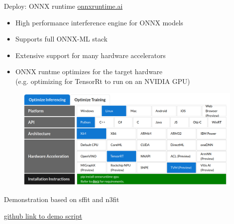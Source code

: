 \documentclass[aspectratio=169,9pt]{beamer}
\begin{document}
\begin{frame}[t]{Deploy: ONNX runtime}{\color{blue} \href{https://onnxruntime.ai/}{onnxruntime.ai}}
  \begin{itemize}
    \item High performance interference engine for ONNX models
    \item Supports full ONNX-ML stack
    \item Extensive support for many hardware accelerators
    \item ONNX runtme optimizes for the target hardware \\
          (e.g. optimizing for TensorRt to run on an NVIDIA GPU)
  \end{itemize}
  \begin{figure}
    \centering
    \includegraphics[width=.6\textwidth]{ONNX-runtime-get-started-chart.png}
  \end{figure}
\end{frame}


\begin{frame}[c,fragile]{Demonstration based on sffit and n3fit}
  \begin{center}
    \href{https://github.com/RoyStegeman/slides/tree/main/ONNX/demos}{\color{blue}github link to demo script}
  \end{center}
\end{frame}


\end{document}
